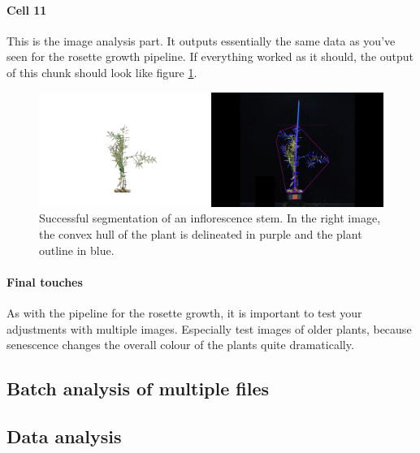 \documentclass[10pt]{article}
\begin{document}
\paragraph*{Cell 11} This is the image analysis part. It outputs essentially the same data as you've seen for the rosette growth pipeline. If everything worked as it should, the output of this chunk should look like figure \ref{fig:inflorescence}.

\begin{figure}[!h]
	\centering
	\includegraphics[width=0.95\linewidth]{inflorescence}
	\caption[Successfully analysed inflorescence.]{Successful segmentation of an inflorescence stem. In the right image, the convex hull of the plant is delineated in purple and the plant outline in blue.}
	\label{fig:inflorescence}
\end{figure}

\paragraph*{Final touches} As with the pipeline for the rosette growth, it is important to test your adjustments with multiple images. Especially test images of older plants, because senescence changes the overall colour of the plants quite dramatically.

\subsection{Batch analysis of multiple files}

\subsection{Data analysis}
\end{document}
